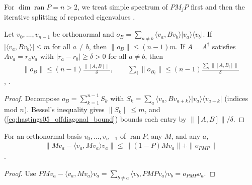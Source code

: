 For $\dim\operatorname{ran}P=n>2$, we treat simple spectrum of $PM_jP$ first
and then the iterative splitting of repeated eigenvalues
\cite[lines 1695--1705]{Hastings2006Solving}.

\begin{lemma}
    \label{thm:hastings05_simple_spectrum_basis}
    \leanok
    Let $v_0,\dots,v_{n-1}$ be orthonormal and
    $o_B=\sum_{a\ne b}\langle v_a,Bv_b\rangle\lvert v_a\rangle\langle v_b\rvert$.
    If $|\langle v_a,Bv_b\rangle|\le m$ for all $a\ne b$, then
    $\|o_B\|\le(n-1)m$. If $A=A^\dagger$ satisfies $Av_a=r_av_a$ with
    $|r_a-r_b|\ge\delta>0$ for all $a\ne b$, then
    \begin{align}
        \|o_B\|\le(n-1)\frac{\|[A,B]\|}{\delta},
        \qquad
        \sum_i\|o_{B_i}\|\le(n-1)\frac{\sum_i\|[A,B_i]\|}{\delta}
        \label{eq:hastings05_simple_spectrum_basis}
    \end{align}
    \cite[lines 1678--1705]{Hastings2006Solving},
    \cite{gap:hastings05_two_dim_ground_basis}.
\end{lemma}
\begin{proof}\leanok
    Decompose $o_B=\sum_{k=1}^{n-1}S_k$ with
    $S_k=\sum_a\langle v_a,Bv_{a+k}\rangle\lvert v_a\rangle\langle v_{a+k}\rvert$
    (indices mod $n$). Bessel's inequality gives $\|S_k\|\le m$, and
    (\ref{eq:hastings05_offdiagonal_bound}) bounds each entry by
    $\|[A,B]\|/\delta$.
\end{proof}

\begin{lemma}
    \label{thm:hastings05_low_up_to_offdiagonal_family}
    \leanok
    For an orthonormal basis $v_0,\dots,v_{n-1}$ of $\operatorname{ran}P$, any
    $M$, and any $a$,
    \begin{align}
        \|Mv_a-\langle v_a,Mv_a\rangle v_a\|\le\|(1-P)Mv_a\|+\|o_{PMP}\|
        \label{eq:hastings05_low_up_to_offdiagonal_family}
    \end{align}
    \cite[eq.~(low), lines 476--491]{Hastings2006Solving}.
\end{lemma}
\begin{proof}\leanok
    Use $PMv_a-\langle v_a,Mv_a\rangle v_a
        =\sum_{b\ne a}\langle v_b,PMPv_a\rangle v_b=o_{PMP}v_a$.
\end{proof}

